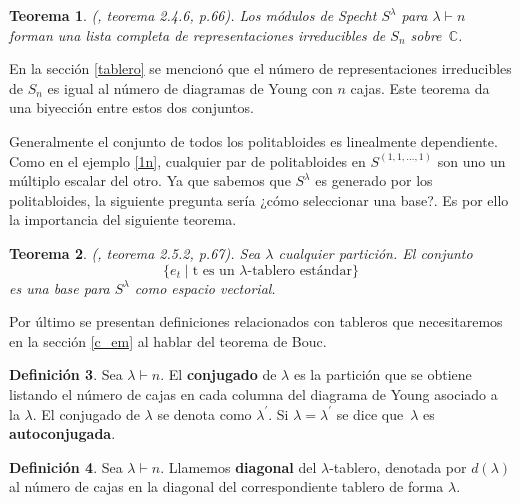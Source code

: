 \documentclass[12pt]{book}
\newtheorem{theorem}{Teorema}[section]
\newtheorem{corollary}[theorem]{Corolario}
\theoremstyle{definition}
\newtheorem{definition}[theorem]{Definición}
\newcounter{in}
\newcounter{ini}
\begin{document}
\begin{theorem}{\normalfont(\cite{sagan2001symmetric}, teorema 2.4.6, p.66)}.
  Los módulos de Specht $S^{\lambda}$ para $\lambda\vdash n$ forman
  una lista completa de representaciones irreducibles de $S_{n}$ sobre~$\mathbb{C}$.
  \label{todas-repr-irre}
\end{theorem}
En la sección \ref{tablero} se mencionó que el número de representaciones irreducibles de $S_{n}$ es igual al número de diagramas de Young con $n$ cajas. Este teorema da una biyección entre estos dos conjuntos.

Generalmente el conjunto de todos los politabloides es linealmente dependiente. Como en el ejemplo \ref{1n}, cualquier par de politabloides en $S^{(1,1,\ldots,1)}$ son uno un múltiplo escalar del
otro. Ya que sabemos que $S^{\lambda}$ es generado por los
politabloides, la siguiente pregunta sería ¿cómo seleccionar una base?. Es por ello la importancia del siguiente teorema.

\begin{theorem}{\normalfont(\cite{sagan2001symmetric}, teorema 2.5.2, p.67)}.
  \label{base-S}
  Sea $\lambda$ cualquier partición. El conjunto
  \begin{equation*}
    \{e_{t}\mid \mbox{t es un $\lambda$-tablero estándar}\}
  \end{equation*}
  es una base para $S^{\lambda}$ como espacio vectorial.
\end{theorem}
Por último se presentan definiciones relacionados con tableros que necesitaremos en la sección \ref{c_em} al hablar del teorema de Bouc.

\begin{definition}
  Sea $\lambda\vdash n$. El \textbf{conjugado} de $\lambda$ es la
  partición que se obtiene listando el número de cajas en cada columna
  del diagrama de Young asociado a la $\lambda$. El conjugado de
  $\lambda$ se denota como $\lambda^{'}$. Si $\lambda=\lambda^{'}$ se
  dice que~$\lambda$ es \textbf{autoconjugada}.
\end{definition}

\begin{definition}
  Sea $\lambda\vdash n$. Llamemos \textbf{diagonal} del
  $\lambda$-tablero, denotada por $d(\lambda)$ al número de
  cajas en la diagonal del correspondiente tablero de forma $\lambda$.
\end{definition}
\end{document}
